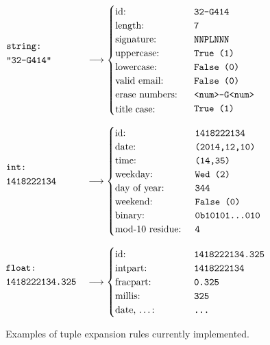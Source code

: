 \begin{figure}
  \newenvironment{stackedlines}{\renewcommand{\arraystretch}{1.2}\begin{array}[b]{@{}l@{\quad}l@{}}}{\end{array}}
  $\begin{stackedlines}
    \texttt{string:}\\
    \texttt{\parbox{\widthof{1418222134.325}}{"32-G414"}}
  \end{stackedlines} \longrightarrow
  \begin{cases}
    \text{id: } & \texttt{32-G414}\\
    \text{length: } & \texttt{7}\\
    \text{signature: } & \texttt{NNPLNNN}\\
    \text{uppercase: } & \texttt{True (1)}\\
    \text{lowercase: } & \texttt{False (0)}\\
    \text{valid email: } & \texttt{False (0)}\\
    \text{erase numbers: } & \texttt{<num>-G<num>}\\
    \text{\parbox{\widthof{base-10 residue:}}{title case:} } & \texttt{True (1)}
  \end{cases}$

  $\begin{stackedlines}
    \texttt{int:}\\
    \texttt{\parbox{\widthof{1418222134.325}}{1418222134}}
  \end{stackedlines} \longrightarrow
  \begin{cases}
    \text{id: } & \texttt{1418222134}\\
    \text{date: } & \texttt{(2014,12,10)}\\
    \text{time: } & \texttt{(14,35)}\\
    \text{weekday: } & \texttt{Wed (2)}\\
    \text{day of year: } & \texttt{344}\\
    \text{weekend: } & \texttt{False (0)}\\
    \text{binary: } & \texttt{0b10101\ldots010}\\
    \text{mod-10 residue: } & \texttt{4}
  \end{cases}$

   $\begin{stackedlines}
    \texttt{float:}\\
    \texttt{1418222134.325}
  \end{stackedlines} \longrightarrow
  \begin{cases}
    \text{id: } & \texttt{1418222134.325}\\
    \text{intpart: } & \texttt{1418222134}\\
    \text{fracpart: } & \texttt{0.325}\\
    \text{millis: } & \texttt{325}\\
    \text{\parbox{\widthof{base-10 residue:}}{date, \ldots:} } & \texttt{\ldots}
  \end{cases}$

  \caption{Examples of tuple expansion rules currently implemented.}
  \label{fig:tuple-expansion}
\end{figure}